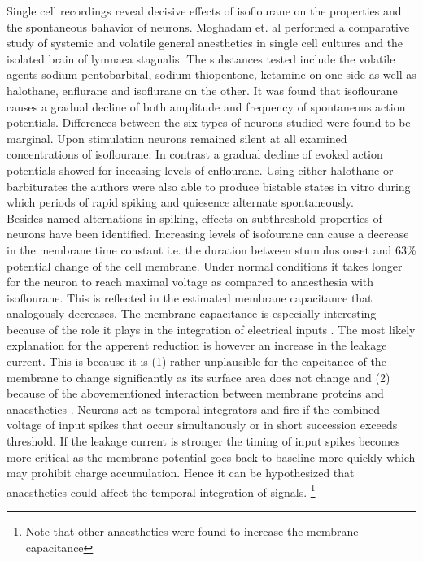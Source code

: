 Single cell recordings reveal decisive effects of isoflourane on the properties and the spontaneous bahavior of neurons. Moghadam et. al \parencite*{moghadam2019comparative} performed a comparative study of systemic and volatile general anesthetics in single cell cultures and the isolated brain of lymnaea stagnalis. The substances tested include the volatile agents sodium pentobarbital, sodium thiopentone, ketamine on one side as well as halothane, enflurane and isoflurane on the other. It was found that isoflourane causes a gradual decline of both amplitude and frequency of spontaneous action potentials. Differences between the six types of neurons studied were found to be marginal. Upon stimulation neurons remained silent at all examined concentrations of isoflourane. In contrast a gradual decline of evoked action potentials showed for inceasing levels of enflourane. Using either halothane or barbiturates the authors were also able to produce bistable states in vitro during which periods of rapid spiking and quiesence alternate spontaneously.\\
Besides named alternations in spiking, effects on subthreshold properties of neurons have been identified. Increasing levels of isofourane can cause a decrease in the membrane time constant i.e. the duration between stumulus onset and 63\% potential change of the cell membrane. Under normal conditions it takes longer for the neuron to reach maximal voltage as compared to anaesthesia with isoflourane. This is reflected in the estimated membrane capacitance that analogously decreases. The membrane capacitance is especially interesting because of the role it plays in the integration of electrical inputs \parencite{golowasch2014}. The most likely explanation for the apperent reduction is however an increase in the leakage current. This is because it is (1) rather unplausible for the capcitance of the membrane to change significantly as its surface area does not change and (2) because of the abovementioned interaction between membrane proteins and anaesthetics \parencite{qazzaz2017modulation}. Neurons act as temporal integrators and fire if the combined voltage of input spikes that occur simultanously or in short succession exceeds threshold. If the leakage current is stronger the timing of input spikes becomes more critical as the membrane potential goes back to baseline more quickly which may prohibit charge accumulation. Hence it can be hypothesized that anaesthetics could affect the temporal integration of signals.  \footnote{ Note that other anaesthetics were found to increase the membrane capacitance}\\
